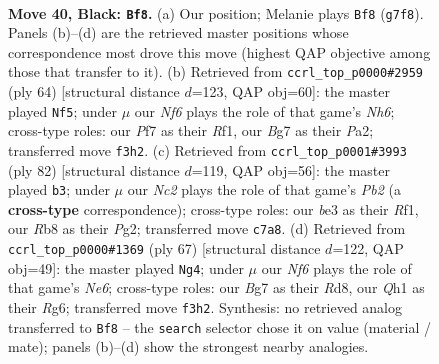 \documentclass[11pt]{article}
\begin{document}
\clearpage

\begin{figure}[p]\centering
\begin{subfigure}{0.46\textwidth}\centering
\resizebox{\linewidth}{!}{%
\newchessgame
\chessboard[
  setfen={1r4k1/1rn2pb1/8/2Q1p3/R3P3/4Bn2/3NKRN1/7q b - - 5 40},
  showmover=false,
  pgfstyle=straightmove, color=movearrow, markmove={g7-f8}
]}
\caption{}
\end{subfigure}\hfill
\begin{subfigure}{0.46\textwidth}\centering
\resizebox{\linewidth}{!}{%
\newchessgame
\chessboard[
  setfen={r2r3k/5pbp/7N/p2Rn3/4P3/2q5/P1B2QP1/5R1K w - - 1 33},
  showmover=false,
  pgfstyle=straightmove, color=movearrow, markmove={h6-f5}
]}
\caption{}
\end{subfigure}
\\[4pt]
\begin{subfigure}{0.46\textwidth}\centering
\resizebox{\linewidth}{!}{%
\newchessgame
\chessboard[
  setfen={4r1n1/p4k1p/1r3bp1/8/3NNR2/p7/1PP3P1/1K3R2 w - - 0 42},
  showmover=false,
  pgfstyle=straightmove, color=movearrow, markmove={b2-b3}
]}
\caption{}
\end{subfigure}\hfill
\begin{subfigure}{0.46\textwidth}\centering
\resizebox{\linewidth}{!}{%
\newchessgame
\chessboard[
  setfen={1k1r4/2pn4/6rp/8/3P3P/3Rnp2/P2N1B2/2K1R3 b - - 0 34},
  showmover=false,
  pgfstyle=straightmove, color=movearrow, markmove={e3-g4}
]}
\caption{}
\end{subfigure}
\caption{\textbf{Move 40, Black: \texttt{Bf8}.} (a) Our position; Melanie plays \texttt{Bf8} (\texttt{g7f8}). Panels (b)--(d) are the retrieved master positions whose correspondence most drove this move (highest QAP objective among those that transfer to it). (b) Retrieved from \texttt{ccrl\_top\_p0000\#2959} (ply 64) [structural distance $d$=123, QAP obj=60]: the master played \texttt{Nf5}; under $\mu$ our \emph{Nf6} plays the role of that game's \emph{Nh6}; cross-type roles: our \emph{P}f7 as their \emph{R}f1, our \emph{B}g7 as their \emph{P}a2; transferred move \texttt{f3h2}. (c) Retrieved from \texttt{ccrl\_top\_p0001\#3993} (ply 82) [structural distance $d$=119, QAP obj=56]: the master played \texttt{b3}; under $\mu$ our \emph{Nc2} plays the role of that game's \emph{Pb2} (a \textbf{cross-type} correspondence); cross-type roles: our \emph{b}e3 as their \emph{R}f1, our \emph{R}b8 as their \emph{P}g2; transferred move \texttt{c7a8}. (d) Retrieved from \texttt{ccrl\_top\_p0000\#1369} (ply 67) [structural distance $d$=122, QAP obj=49]: the master played \texttt{Ng4}; under $\mu$ our \emph{Nf6} plays the role of that game's \emph{Ne6}; cross-type roles: our \emph{B}g7 as their \emph{R}d8, our \emph{Q}h1 as their \emph{R}g6; transferred move \texttt{f3h2}. Synthesis: no retrieved analog transferred to \texttt{Bf8} -- the \texttt{search} selector chose it on value (material / mate); panels (b)--(d) show the strongest nearby analogies.}
\label{fig:thought-m79}
\end{figure}
\end{document}
